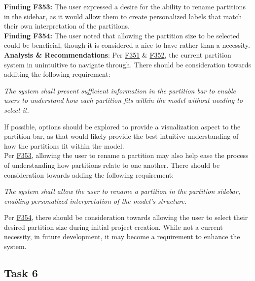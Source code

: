 \documentclass{article}
\begin{document}
\noindent \hypertarget{finding:F353}{\textbf{Finding F353:}} 
The user expressed a desire for the ability to rename partitions in the sidebar, as it would allow them to create personalized labels that match their own interpretation of the partitions.\\ 

\noindent \hypertarget{finding:F354}{\textbf{Finding F354:}} 
The user noted that allowing the partition size to be selected could be beneficial, though it is considered a nice-to-have rather than a necessity. \\ 

\noindent \textbf{Analysis \& Recommendations}:
Per \hyperlink{finding:F351}{F351} \& \hyperlink{finding:F352}{F352}, the current partition system in unintuitive to navigate through. There should be consideration towards additing the following requirement:

\begin{center}
  \textit{The system shall present sufficient information in the partition bar to enable users to understand how each partition fits within the model without needing to select it.}\\
\end{center}

\noindent If possible, options should be explored to provide a visualization aspect to the partition bar, as that would likely provide the best intuitive understanding of how the partitions fit within the model.\\

\noindent Per \hyperlink{finding:F353}{F353}, allowing the user to rename a partition may also help ease the process of understanding how partitions relate to one another. There should be consideration towards adding the following requirement:

\begin{center}
    \textit{The system shall allow the user to rename a partition in the partition sidebar, enabling personalized interpretation of the model’s structure.}\\
  \end{center}

  \noindent Per \hyperlink{finding:F354}{F354}, there should be consideration towards allowing the user to select their desired partition size during initial project creation. While not a current necessity, in future development, it may become a requirement to enhance the system.


  \subsection{Task 6}
\end{document}
